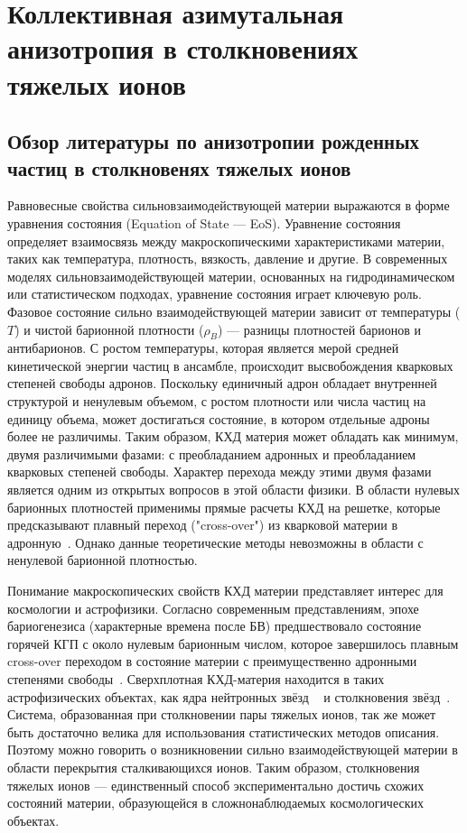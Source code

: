 \chapter{Коллективная азимутальная анизотропия в столкновениях тяжелых ионов} \label{chapt1}

\section{Обзор литературы по анизотропии рожденных частиц в столкновенях тяжелых ионов}

Равновесные свойства сильновзаимодействующей материи выражаются в форме уравнения состояния (Equation of State — EoS). 
Уравнение состояния определяет взаимосвязь между макроскопическими характеристиками материи, таких как температура, плотность, вязкость, давление и другие.
В современных моделях сильновзаимодействующей материи, основанных на гидродинамическом или статистическом подходах, уравнение состояния играет ключевую роль.
Фазовое состояние сильно взаимодействующей материи зависит от температуры ($T$) и чистой барионной плотности ($\rho_B$) --- разницы плотностей барионов и антибарионов.
С ростом температуры, которая является мерой средней кинетической энергии частиц в ансамбле, происходит высвобождения кварковых степеней свободы адронов.
Поскольку единичный адрон обладает внутренней структурой и ненулевым объемом, с ростом плотности или числа частиц на единицу объема, может достигаться состояние, в котором отдельные адроны более не различимы.
Таким образом, КХД материя может обладать как минимум, двумя различимыми фазами: с преобладанием адронных и преобладанием кварковых степеней свободы.
Характер перехода между этими двумя фазами является одним из открытых вопросов в этой области физики.
В области нулевых барионных плотностей применимы прямые расчеты КХД на решетке, которые предсказывают плавный переход ("cross-over") из кварковой материи в адронную~\cite{Esumi:2022uas}.
Однако данные теоретические методы невозможны в области с ненулевой барионной плотностью.


Понимание макроскопических свойств КХД материи представляет интерес для космологии и астрофизики. Согласно современным представлениям, эпохе бариогенезиса (характерные времена после БВ) предшествовало состояние горячей КГП с около нулевым барионным числом, которое завершилось плавным cross-over переходом в состояние материи с преимущественно адронными степенями свободы~\cite{Esumi:2022uas}.
Сверхплотная КХД-материя находится в таких астрофизических объектах, как ядра нейтронных звёзд ~\cite{Danielewicz:2002pu} и столкновения звёзд~\cite{Adamczewski-Musch:2019byl}.
Система, образованная при столкновении пары тяжелых ионов, так же может быть достаточно велика для использования статистических методов описания.
Поэтому можно говорить о возникновении сильно взаимодействующей материи в области перекрытия сталкивающихся ионов.
Таким образом, столкновения тяжелых ионов --- единственный способ экспериментально достичь схожих состояний материи, образующейся в сложнонаблюдаемых космологических объектах.

